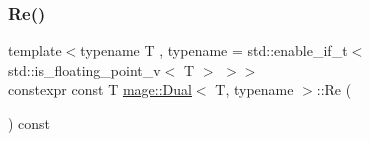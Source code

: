 \mbox{\label{structmage_1_1_dual_a106aab088b16ef1dc5e9363f44c9a2d1}} 
\subsubsection{\texorpdfstring{Re()}{Re()}\hspace{0.1cm}{\footnotesize\ttfamily [2/2]}}
{\footnotesize\ttfamily template$<$typename T , typename  = std\+::enable\+\_\+if\+\_\+t$<$ std\+::is\+\_\+floating\+\_\+point\+\_\+v$<$ T $>$ $>$$>$ \\
constexpr const T \mbox{\hyperlink{structmage_1_1_dual}{mage\+::\+Dual}}$<$ T, typename $>$\+::Re (\begin{DoxyParamCaption}{ }\end{DoxyParamCaption}) const\hspace{0.3cm}{\ttfamily [noexcept]}}

